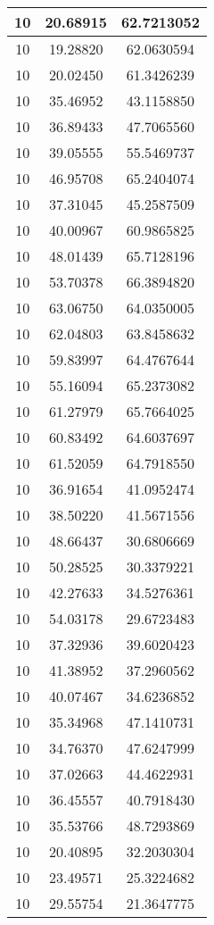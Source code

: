 \documentclass[
]{book}
\begin{document}
\begin{tabular}{c|c|c}
\hline
10 & 20.68915 & 62.7213052\\
\hline
10 & 19.28820 & 62.0630594\\
\hline
10 & 20.02450 & 61.3426239\\
\hline
10 & 35.46952 & 43.1158850\\
\hline
10 & 36.89433 & 47.7065560\\
\hline
10 & 39.05555 & 55.5469737\\
\hline
10 & 46.95708 & 65.2404074\\
\hline
10 & 37.31045 & 45.2587509\\
\hline
10 & 40.00967 & 60.9865825\\
\hline
10 & 48.01439 & 65.7128196\\
\hline
10 & 53.70378 & 66.3894820\\
\hline
10 & 63.06750 & 64.0350005\\
\hline
10 & 62.04803 & 63.8458632\\
\hline
10 & 59.83997 & 64.4767644\\
\hline
10 & 55.16094 & 65.2373082\\
\hline
10 & 61.27979 & 65.7664025\\
\hline
10 & 60.83492 & 64.6037697\\
\hline
10 & 61.52059 & 64.7918550\\
\hline
10 & 36.91654 & 41.0952474\\
\hline
10 & 38.50220 & 41.5671556\\
\hline
10 & 48.66437 & 30.6806669\\
\hline
10 & 50.28525 & 30.3379221\\
\hline
10 & 42.27633 & 34.5276361\\
\hline
10 & 54.03178 & 29.6723483\\
\hline
10 & 37.32936 & 39.6020423\\
\hline
10 & 41.38952 & 37.2960562\\
\hline
10 & 40.07467 & 34.6236852\\
\hline
10 & 35.34968 & 47.1410731\\
\hline
10 & 34.76370 & 47.6247999\\
\hline
10 & 37.02663 & 44.4622931\\
\hline
10 & 36.45557 & 40.7918430\\
\hline
10 & 35.53766 & 48.7293869\\
\hline
10 & 20.40895 & 32.2030304\\
\hline
10 & 23.49571 & 25.3224682\\
\hline
10 & 29.55754 & 21.3647775\\

\end{tabular}
\end{document}
